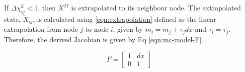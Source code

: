 If $\Delta \chi_{ij}^{2} < 1$, then $X^M$ is extrapolated to its neighbour node. The extrapolated state, $\widetilde{X}_{ij}$, is calculated using \eqref{eqn:extrapolation} defined as the linear extrapolation from node $j$ to node $i$, given by $m_i = m_j + \tau_j dx$ and $\tau_i = \tau_j$. Therefore, the derived Jacobian is given by Eq \eqref{eqn:mc-model-F}.

\begin{equation}
F = \begin{bmatrix} 1 & dx \\ 0 & 1 \end{bmatrix}
\label{eqn:mc-model-F}
\end{equation}



\begin{center}
\begin{figure}[htbp]%
    \centering
    \hfill

\end{figure}
\end{center}

